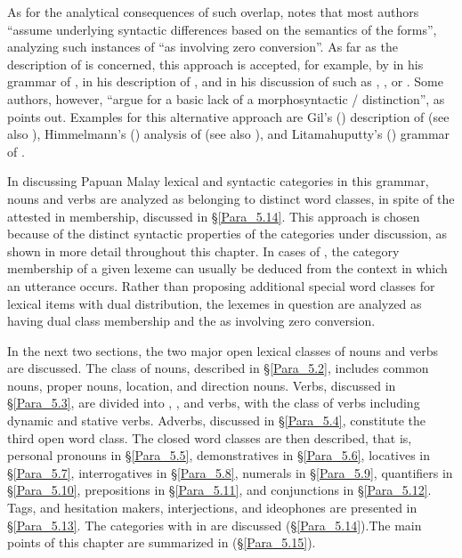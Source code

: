 As for the analytical consequences of such overlap, \citet[128]{Himmelmann.2005} notes that most authors “assume underlying syntactic differences based on the semantics of the forms”, analyzing such instances of  “as involving zero conversion”. As far as the description of  is concerned, this approach is accepted, for example, by \citet{vanMinde.1997} in his grammar of , \citet{Stoel.2005} in his description of , and \citet[250]{Paauw.2009} in his discussion of  such as , , or . Some authors, however, “argue for a basic lack of a morphosyntactic / distinction”, as \citet[128]{Himmelmann.2005} points out. Examples for this alternative approach are Gil’s (\citeyear*{Gil.2013}) description of  (see also \citealt{Gil.1994}), Himmelmann’s (\citeyear*{Himmelmann.2008}) analysis of  (see also \citealt{Himmelmann.1991}), and Litamahuputty’s (\citeyear*{Litamahuputty.2012}) grammar of .



In discussing Papuan Malay lexical and syntactic categories in this grammar, nouns and verbs are analyzed as belonging to distinct word classes, in spite of the attested  in membership, discussed in §\ref{Para_5.14}. This approach is chosen because of the distinct syntactic properties of the categories under discussion, as shown in more detail throughout this chapter. In cases of , the category membership of a given lexeme can usually be deduced from the context in which an utterance occurs. Rather than proposing additional special word classes for lexical items with dual distribution, the lexemes in question are analyzed as having dual class membership and the  as involving zero conversion.



In the next two sections, the two major open lexical classes of nouns and verbs are discussed. The class of nouns, described in §\ref{Para_5.2}, includes common nouns, proper nouns, location, and direction nouns. Verbs, discussed in §\ref{Para_5.3}, are divided into , , and  verbs, with the class of  verbs including dynamic and stative verbs. Adverbs, discussed in §\ref{Para_5.4}, constitute the third open word class. The closed word classes are then described, that is, personal pronouns in §\ref{Para_5.5}, demonstratives in §\ref{Para_5.6}, locatives in §\ref{Para_5.7}, interrogatives in §\ref{Para_5.8}, numerals in §\ref{Para_5.9}, quantifiers in §\ref{Para_5.10}, prepositions in §\ref{Para_5.11}, and conjunctions in §\ref{Para_5.12}. Tags,  and hesitation makers, interjections, and ideophones are presented in §\ref{Para_5.13}. The categories with  in  are discussed (§\ref{Para_5.14}).The main points of this chapter are summarized in (§\ref{Para_5.15}).


